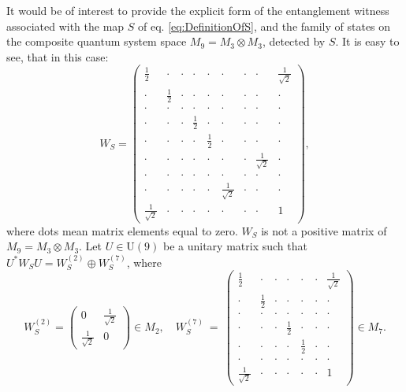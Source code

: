 \documentclass[12pt]{article}
\theoremstyle{plain}
\theoremstyle{definition}
\theoremstyle{remark}
\numberwithin{equation}{section}
\begin{document}
It would be of interest to provide the explicit form of the entanglement
witness associated with the map $S$ of eq. \eqref{eq:DefinitionOfS},
and the family of states on the composite quantum system space
$M_{9} = M_{3} \! \otimes \! M_{3}$, detected by $S$.
It is easy to see, that in this case:
\begin{equation}
\label{WS-C}
 W_S =  \left( \begin{array}{ccc|ccc|ccc}
 \frac{1}{2} &  \cdot& \cdot& \cdot& \cdot& \cdot& \cdot& \cdot& \frac{1}{\sqrt{2}} \\
 \cdot& \frac{1}{2} &\cdot& \cdot& \cdot& \cdot& \cdot& \cdot& \cdot\\
 \cdot& \cdot& \cdot & \cdot& \cdot& \cdot& \cdot& \cdot& \cdot  \\ \hline
 \cdot& \cdot& \cdot& \frac{1}{2} & \cdot& \cdot& \cdot& \cdot&  \cdot \\
 \cdot& \cdot& \cdot& \cdot& \frac{1}{2} & \cdot& \cdot& \cdot&  \cdot \\
 \cdot& \cdot& \cdot& \cdot& \cdot& \cdot& \cdot & \frac{1}{\sqrt{2}}& \cdot  \\ \hline
 \cdot& \cdot& \cdot & \cdot& \cdot& \cdot& \cdot& \cdot& \cdot  \\ 
 \cdot & \cdot& \cdot& \cdot& \cdot& \frac{1}{\sqrt{2}}& \cdot& \cdot& \cdot \\
 \frac{1}{\sqrt{2}}& \cdot& \cdot& \cdot& \cdot & \cdot& \cdot& \cdot& 1
  \end{array} \right),
\end{equation}
where dots mean matrix elements equal to zero.
$W_{S}$ is not a positive matrix of $M_{9} = M_{3} \! \otimes \! M_{3}$.
Let $U \in \text{U}(9)$ be a unitary matrix such that
$U^{*} W_{S} U = W_{S}^{(2)} \oplus W_{S}^{(7)}$,
where
\begin{equation}
\label{WS-DirectSum}
 W_{S}^{(2)} = \left(\begin{array}{cc}
    0 & \frac{1}{\sqrt{2}}  \\ \frac{1}{\sqrt{2}}  & 0
  \end{array}\right) \in M_{2}, \quad
 W_S^{(7)}\ = \  \left( \begin{array}{ccccccc}
 \frac{1}{2} &  \cdot& \cdot& \cdot& \cdot& \cdot& \frac{1}{\sqrt{2}} \\
 \cdot& \frac{1}{2} &\cdot& \cdot& \cdot& \cdot& \cdot\\
 \cdot& \cdot& \cdot & \cdot& \cdot& \cdot& \cdot \\ 
 \cdot& \cdot& \cdot& \frac{1}{2} & \cdot&  \cdot& \cdot \\
 \cdot& \cdot& \cdot& \cdot& \frac{1}{2} & \cdot& \cdot \\
 \cdot& \cdot& \cdot & \cdot& \cdot& \cdot& \cdot  \\ 
 \frac{1}{\sqrt{2}}& \cdot& \cdot& \cdot& \cdot& \cdot& 1
  \end{array} \right) \in M_{7}.
\end{equation}
\end{document}
